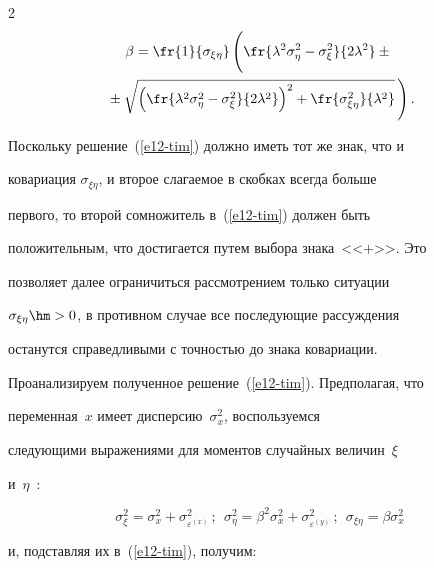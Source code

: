 \begin{multicols}{2}
\begin{multline}
\beta= \fr{1}{\sigma_{\xi\eta}}\left(

\vphantom{\sqrt{\left( \fr{\lambda^2\sigma^2_\eta -

\sigma^2_\xi}{2\lambda^2}\right)^2

+\fr{\sigma^2_{\xi\eta}}{\lambda^2}}}

 \fr{\lambda^2\sigma^2_\eta -

\sigma_\xi^2}{2\lambda^2}\pm {}\right.\\

\left.{}\pm\sqrt{\left( \fr{\lambda^2\sigma^2_\eta -

\sigma^2_\xi}{2\lambda^2}\right)^2

+\fr{\sigma^2_{\xi\eta}}{\lambda^2}}\,\right).

\label{e12-tim}

\end{multline}



  Поскольку решение~(\ref{e12-tim}) должно иметь тот же знак, что и

ковариация $\sigma_{\xi\eta}$, и второе слагаемое в скобках всегда больше

первого, то второй сомножитель в~(\ref{e12-tim}) должен быть

положительным, что достигается путем выбора знака~<<$+$>>. Это

позволяет далее ограничиться рассмотрением только ситуации

$\sigma_{\xi\eta}\hm>0$, в противном случае все последующие рассуждения

останутся справедливыми с точностью до знака ковариации.



  Проанализируем полученное решение~(\ref{e12-tim}). Предполагая, что

переменная~$x$ имеет дис\-пер\-сию~$\sigma_x^2$, воспользуемся

следующими выражениями для моментов случайных величин~$\xi$

и~$\eta$~\cite{10-tim}:

  $$

  \sigma^2_\xi=\sigma^2_x+\sigma^2_{\varepsilon^{(x)}}\,;\ \ 

  \sigma^2_\eta=\beta^2\sigma^2_x+\sigma^2_{\varepsilon^{(y)}}\,;\ \ 

  \sigma_{\xi\eta}= \beta \sigma_x^2

  $$

и, подставляя их в~(\ref{e12-tim}), получим:


\end{multicols}
